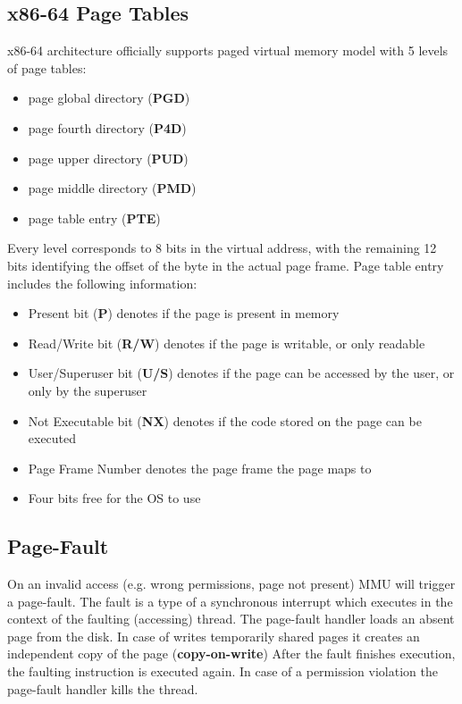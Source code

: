 \documentclass[conference]{IEEEtran}
\begin{document}
\subsection{x86-64 Page Tables}
x86-64 architecture officially supports paged virtual memory model with 5 levels of page tables:
\begin{itemize}
    \item page global directory (\textbf{PGD})
    \item page fourth directory (\textbf{P4D})
    \item page upper directory (\textbf{PUD})
    \item page middle directory (\textbf{PMD})
    \item page table entry (\textbf{PTE})
\end{itemize}

Every level corresponds to 8 bits in the virtual address, with the remaining 12 bits identifying the offset of the byte in the actual page frame.
Page table entry includes the following information:
\begin{itemize}
    \item Present bit (\textbf{P}) denotes if the page is present in memory
    \item Read/Write bit (\textbf{R/W}) denotes if the page is writable, or only readable
    \item User/Superuser bit (\textbf{U/S}) denotes if the page can be accessed by the user, or only by the superuser
    \item Not Executable bit (\textbf{NX}) denotes if the code stored on the page can be executed
    \item Page Frame Number denotes the page frame the page maps to
    \item Four bits free for the OS to use
\end{itemize}

\subsection{Page-Fault}
On an invalid access (e.g. wrong permissions, page not present) MMU will trigger a page-fault. The fault is a type of a synchronous interrupt which executes in the context of the faulting (accessing) thread. The page-fault handler loads an absent page from the disk. In case of writes temporarily shared pages it creates an independent copy of the page (\textbf{copy-on-write}) After the fault finishes execution, the faulting instruction is executed again. In case of a permission violation the page-fault handler kills the thread.
\end{document}
